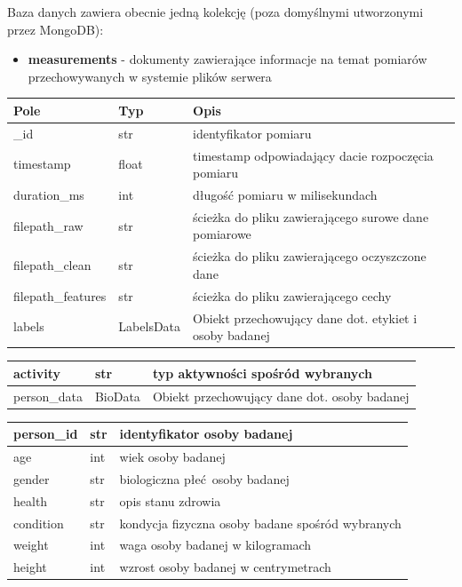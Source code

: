 	Baza danych zawiera obecnie jedną kolekcję (poza domyślnymi utworzonymi przez MongoDB): 
	\begin{itemize}
	\label{metadata}
		\item{\textbf{measurements} - dokumenty zawierające informacje na temat pomiarów przechowywanych w systemie plików serwera}
		
	\end{itemize}
	\begin{center}
		\begin{tabular}{|l|l|l|}
			\hline
			Pole & Typ & Opis \\
			\hline
			\_id & str & identyfikator pomiaru \\
			\hline
			timestamp & float & timestamp odpowiadający dacie rozpoczęcia pomiaru \\ 
			\hline
			duration\_ms  & int & długość pomiaru w milisekundach \\
			\hline
			filepath\_raw & str & ścieżka do pliku zawierającego surowe dane pomiarowe \\
			\hline
			filepath\_clean & str & ścieżka do pliku zawierającego oczyszczone dane \\
			\hline
			filepath\_features & str & ścieżka do pliku zawierającego cechy \\
			\hline
			labels & LabelsData & Obiekt przechowujący dane dot. etykiet i osoby badanej \\
			\hline
		\end{tabular}
	\end{center}
		
		\begin{center}
			\begin{tabular}{|l|l|l|}
				\hline
				activity & str & typ aktywności spośród wybranych \\
				\hline
				person\_data & BioData & Obiekt przechowujący dane dot. osoby badanej \\
				\hline 
			\end{tabular}
		\end{center}
			
			\begin{center}
				\begin{tabular}{|l|l|l|}
					\hline
					person\_id & str & identyfikator osoby badanej \\
					\hline
					age & int & wiek osoby badanej \\
					\hline
					gender & str & biologiczna płeć osoby badanej \\
					\hline
					health & str & opis stanu zdrowia \\
					\hline
					condition & str & kondycja fizyczna osoby badane spośród wybranych \\
					\hline
					weight & int & waga osoby badanej w kilogramach \\
					\hline
					height & int & wzrost osoby badanej w centrymetrach \\
					\hline 
				\end{tabular}
			\end{center}
			
